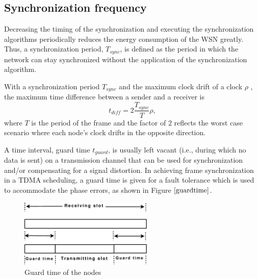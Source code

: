 \documentclass[journal]{IEEEtran}
\begin{document}
\subsection{\textbf{Synchronization frequency}}
Decreasing the timing of the synchronization and executing the synchronization algorithms periodically reduces
the energy consumption of the WSN greatly. Thus, a synchronization period, $T_{sync}$, is defined as the period in which the network can stay synchronized without the application of the synchronization algorithm.
\par With a synchronization period $T_{sync}$ and the
maximum clock drift of a clock $\rho$ , the maximum time difference
between a sender and a receiver is
\begin{equation}
t_{diff} = 2\frac{T_{sync}}{T}\rho ,
\end{equation}
where $T$ is the period of the frame and the factor of $2$ reflects the worst case scenario where each
node's clock drifts in the opposite direction.\par
A time interval, guard time $t_{guard}$, is usually left vacant (i.e., during which no data is sent) on a transmission channel that can be used for synchronization and/or compensating for a signal distortion. In achieving frame synchronization in a TDMA scheduling, a guard time is given for a fault tolerance which is used to accommodate the phase errors, as shown in Figure $\ref{guardtime}$.
\begin{figure}[t]
\centering
\includegraphics[width=2.5in]{guardtime}
\caption{Guard time of the nodes} \label{guardtime}
\end{figure}
\end{document}

